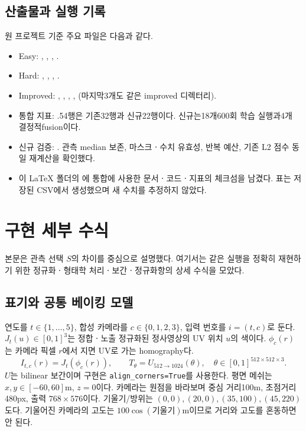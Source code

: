 \documentclass[11pt,a4paper]{article}
\begin{document}
\subsection{산출물과 실행 기록}
원 프로젝트 기준 주요 파일은 다음과 같다.
\begin{itemize}
\item Easy: , , , .
\item Hard: , , , .
\item Improved: , , , ,  (마지막3개도 같은 improved 디렉터리).
\item 통합 지표: .54행은 기존32행과 신규22행이다. 신규는18개600회 학습 실행과4개 결정적fusion이다.
\item 신규 검증: . 관측 median 보존, 마스크ㆍ수치 유효성, 반복 예산, 기존 L2 점수 동일 재계산을 확인했다.
\item 이 LaTeX 폴더의 에 통합에 사용한 문서ㆍ코드ㆍ지표의 체크섬을 남겼다. 표는 저장된 CSV에서 생성했으며 새 수치를 추정하지 않았다.
\end{itemize}

\clearpage
\appendix
\section{구현 세부 수식}
본문은 관측 선택 $S$의 차이를 중심으로 설명했다. 여기서는 같은 실행을 정확히 재현하기 위한 정규화ㆍ형태학 처리ㆍ보간ㆍ정규화항의 상세 수식을 모았다.\par
\subsection{표기와 공통 베이킹 모델}
연도를 $t\in\{1,\ldots,5\}$, 합성 카메라를 $c\in\{0,1,2,3\}$, 입력 번호를 $i=(t,c)$로 둔다. $J_t(u)\in[0,1]^3$는 정합ㆍ노출 정규화된 정사영상의 UV 위치 $u$의 색이다. $\phi_c(r)$는 카메라 픽셀 $r$에서 지면 UV로 가는 homography다.
\begin{equation}
 I_{t,c}(r)=J_t(\phi_c(r)),\qquad T_\theta=U_{512\to1024}(\theta),\quad
 \theta\in[0,1]^{512\times512\times3}.
\end{equation}
$U$는 bilinear 보간이며 구현은 \texttt{align\_corners=True}를 사용한다. 평면 메쉬는 $x,y\in[-60,60]$m, $z=0$이다. 카메라는 원점을 바라보며 중심 거리100m, 초점거리480px, 출력 $768\times576$이다. 기울기/방위는 $(0,0),(20,0),(35,100),(45,220)$도다. 기울어진 카메라의 고도는 $100\cos(\text{기울기})$m이므로 거리와 고도를 혼동하면 안 된다.
\end{document}
